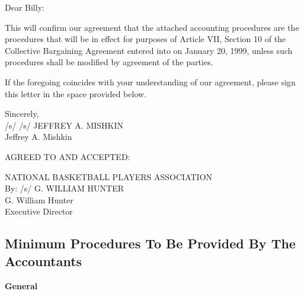 \documentclass[
]{book}
\begin{document}
Dear Billy:

This will confirm our agreement that the attached accounting procedures are the procedures that will be in effect for purposes of Article VII, Section 10 of the Collective Bargaining Agreement entered into on January 20, 1999, unless such procedures shall be modified by agreement of the parties.

If the foregoing coincides with your understanding of our agreement, please sign this letter in the space provided below.

Sincerely,\\
/s/ /s/ JEFFREY A. MISHKIN\\
Jeffrey A. Mishkin

AGREED TO AND ACCEPTED:

NATIONAL BASKETBALL PLAYERS ASSOCIATION\\
By: /s/ G. WILLIAM HUNTER\\
G. William Hunter\\
Executive Director

\newpage

\hypertarget{minimum-procedures-to-be-provided-by-the-accountants}{%
\subsection{Minimum Procedures To Be Provided By The Accountants}\label{minimum-procedures-to-be-provided-by-the-accountants}}

\textbf{General}
\end{document}
